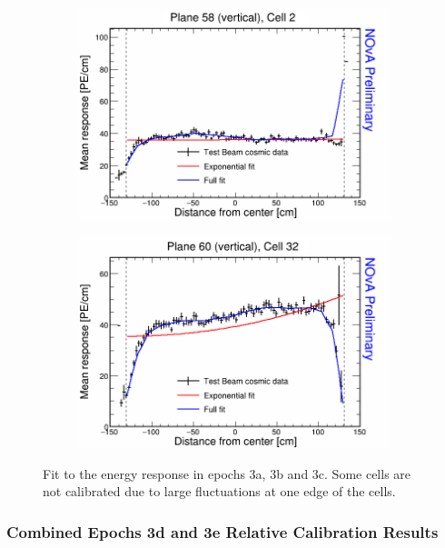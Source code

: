 \begin{figure}[h]
  \begin{subfigure}{0.495\textwidth}
    \includegraphics[width=\linewidth]{Plots/RelativeCalibrationResults/ep3abc_058_002.png}
  \end{subfigure}
  \begin{subfigure}{0.495\textwidth}
    \includegraphics[width=\linewidth]{Plots/RelativeCalibrationResults/ep3abc_060_032.png}
  \end{subfigure}
  \caption[Attenuation fits for cells with large fluctuations in period 3 data]{Fit to the energy response in epochs 3a, 3b and 3c. Some cells are not calibrated due to large fluctuations at one edge of the cells.}
  \label{fig:AttenfitResultsEpoch3abc_CellEdges}
\end{figure}

\subsubsection*{Combined Epochs 3d and 3e Relative Calibration Results}

